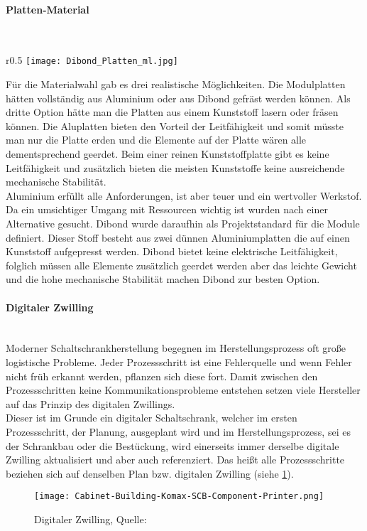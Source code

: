     \paragraph{Platten-Material}\mbox{}\\
    \begin{wrapfigure}{r}{0.5\textwidth}
        \vspace{-30px}
        \texttt{[image: Dibond\_Platten\_ml.jpg]}
        \caption{Dibond-Platte, Quelle: \cite{Dibond-Platte}}
        \vspace{-20px}
        \label{fig:Sommerprototyp}
    \end{wrapfigure}
    Für die Materialwahl gab es drei realistische Möglichkeiten. Die Modulplatten hätten vollständig aus Aluminium oder aus Dibond gefräst werden können. Als dritte Option hätte man die Platten aus einem Kunststoff lasern oder fräsen können. Die Aluplatten bieten den Vorteil der Leitfähigkeit und somit müsste man nur die Platte erden und die Elemente auf der Platte wären alle dementsprechend geerdet. Beim einer reinen Kunststoffplatte gibt es keine Leitfähigkeit und zusätzlich bieten die meisten Kunststoffe keine ausreichende mechanische Stabilität.\\    
    Aluminium erfüllt alle Anforderungen, ist aber teuer und ein wertvoller Werkstof. Da ein umsichtiger Umgang mit Ressourcen wichtig ist wurden nach einer Alternative gesucht. Dibond wurde daraufhin als Projektstandard für die Module definiert. Dieser Stoff besteht aus zwei dünnen Aluminiumplatten die auf einen Kunststoff aufgepresst werden. Dibond bietet keine elektrische Leitfähigkeit, folglich müssen alle Elemente zusätzlich geerdet werden aber das leichte Gewicht und die hohe mechanische Stabilität machen Dibond zur besten Option.

    \paragraph{Digitaler Zwilling}\mbox{}\\
    Moderner Schaltschrankherstellung begegnen im Herstellungsprozess oft große logistische Probleme. Jeder Prozessschritt ist eine Fehlerquelle und wenn Fehler nicht früh erkannt werden, pflanzen sich diese fort. Damit zwischen den Prozessschritten keine Kommunikationsprobleme entstehen setzen viele Hersteller auf das Prinzip des digitalen Zwillings.\\
    Dieser ist im Grunde ein digitaler Schaltschrank, welcher im ersten Prozessschritt, der Planung, ausgeplant wird und im Herstellungsprozess, sei es der Schrankbau oder die Bestückung, wird einerseits immer derselbe digitale Zwilling aktualisiert und aber auch referenziert. Das heißt alle Prozessschritte beziehen sich auf denselben Plan bzw. digitalen Zwilling (siehe \ref{fig:digilaerZwilling}).
    \begin{figure}[H]
        \centering
        \texttt{[image: Cabinet-Building-Komax-SCB-Component-Printer.png]}
        \caption{Digitaler Zwilling, Quelle: \cite{digitaler_zwilling_bild}}
        \label{fig:digilaerZwilling}
    \end{figure}
    
